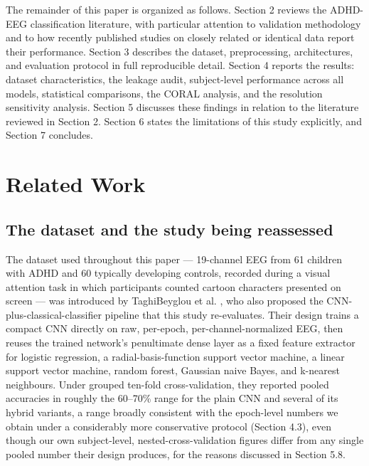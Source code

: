 \documentclass[a4paper,fleqn]{cas-sc}
\begin{document}
The remainder of this paper is organized as follows. Section 2 reviews the ADHD-EEG classification literature, with particular attention to validation methodology and to how recently published studies on closely related or identical data report their performance. Section 3 describes the dataset, preprocessing, architectures, and evaluation protocol in full reproducible detail. Section 4 reports the results: dataset characteristics, the leakage audit, subject-level performance across all models, statistical comparisons, the CORAL analysis, and the resolution sensitivity analysis. Section 5 discusses these findings in relation to the literature reviewed in Section 2. Section 6 states the limitations of this study explicitly, and Section 7 concludes.



\section{Related Work}

\subsection{The dataset and the study being reassessed}

The dataset used throughout this paper --- 19-channel EEG from 61 children with ADHD and 60 typically developing controls, recorded during a visual attention task in which participants counted cartoon characters presented on screen --- was introduced by TaghiBeyglou et al. \cite{taghibeyglou2022detection}, who also proposed the CNN-plus-classical-classifier pipeline that this study re-evaluates. Their design trains a compact CNN directly on raw, per-epoch, per-channel-normalized EEG, then reuses the trained network's penultimate dense layer as a fixed feature extractor for logistic regression, a radial-basis-function support vector machine, a linear support vector machine, random forest, Gaussian naive Bayes, and k-nearest neighbours. Under grouped ten-fold cross-validation, they reported pooled accuracies in roughly the 60--70\% range for the plain CNN and several of its hybrid variants, a range broadly consistent with the epoch-level numbers we obtain under a considerably more conservative protocol (Section 4.3), even though our own subject-level, nested-cross-validation figures differ from any single pooled number their design produces, for the reasons discussed in Section 5.8.
\end{document}
